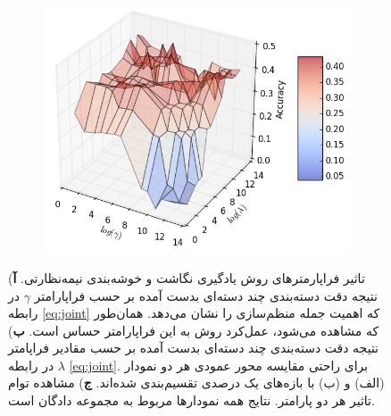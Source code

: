 \begin{figure}[h]
\begin{subfigure}[b]{0.3\linewidth}
    \includegraphics[width=\linewidth]{images/jeac_params}
    \caption{}
  \end{subfigure}
  \caption[تحلیل فراپارامترهای روش یادگیری نگاشت و خوشه‌بندی توام]{
  تاثیر فراپارمترهای  روش یادگیری نگاشت و خوشه‌بندی نیمه‌نظارتی.    \textbf{آ}) نتیجه دقت دسته‌بندی چند دسته‌ای بدست آمده بر حسب فراپارامتر  $\gamma$ در رابطه
\eqref{eq:joint}
 که اهمیت جمله منظم‌سازی را نشان می‌دهد. همان‌طور که مشاهده می‌شود، عمل‌کرد روش به این فراپارامتر حساس است.
 \textbf{ب})
 نتیجه دقت  دسته‌بندی چند دسته‌ای بدست آمده بر حسب مقادیر فراپامتر $\lambda$ در رابطه \eqref{eq:joint}.
برای راحتی مقایسه محور عمودی  هر دو نمودار (الف) و (ب) با بازه‌های یک درصدی تقسیم‌بندی شده‌اند.
\textbf{ج})
مشاهده توام تاثیر هر دو پارامتر.
 نتایج همه نمودارها مربوط به مجموعه دادگان  است.
 }
  \label{fig:jeac_params}
  \end{figure}

